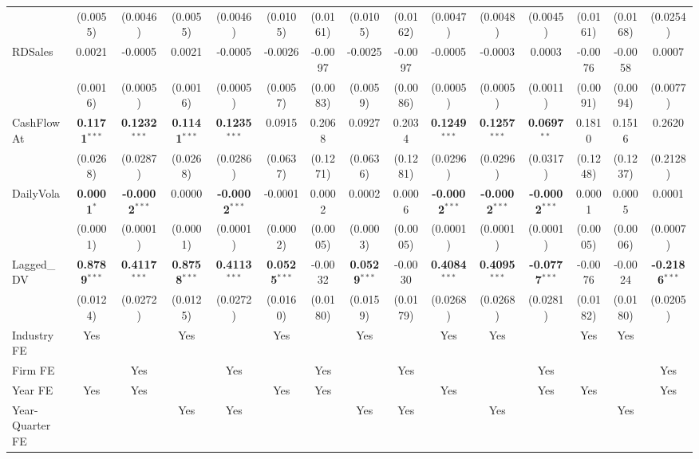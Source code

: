 \begin{landscape}
\begin{table}[H]
\begin{tabular}{lcccccccccccccc}
 & (0.0055) & (0.0046) & (0.0055) & (0.0046) & (0.0105) & (0.0161) & (0.0105) & (0.0162) & (0.0047) & (0.0048) & (0.0045) & (0.0161) & (0.0168) & (0.0254) \\
RDSales & 0.0021 & -0.0005 & 0.0021 & -0.0005 & -0.0026 & -0.0097 & -0.0025 & -0.0097 & -0.0005 & -0.0003 & 0.0003 & -0.0076 & -0.0058 & 0.0007 \\
 & (0.0016) & (0.0005) & (0.0016) & (0.0005) & (0.0057) & (0.0083) & (0.0059) & (0.0086) & (0.0005) & (0.0005) & (0.0011) & (0.0091) & (0.0094) & (0.0077) \\
CashFlowAt & \textbf{0.1171}$^{***}$ & \textbf{0.1232}$^{***}$ & \textbf{0.1141}$^{***}$ & \textbf{0.1235}$^{***}$ & 0.0915 & 0.2068 & 0.0927 & 0.2034 & \textbf{0.1249}$^{***}$ & \textbf{0.1257}$^{***}$ & \textbf{0.0697}$^{**}$ & 0.1810 & 0.1516 & 0.2620 \\
 & (0.0268) & (0.0287) & (0.0268) & (0.0286) & (0.0637) & (0.1271) & (0.0636) & (0.1281) & (0.0296) & (0.0296) & (0.0317) & (0.1248) & (0.1237) & (0.2128) \\
DailyVola & \textbf{0.0001}$^{*}$ & \textbf{-0.0002}$^{***}$ & 0.0000 & \textbf{-0.0002}$^{***}$ & -0.0001 & 0.0002 & 0.0002 & 0.0006 & \textbf{-0.0002}$^{***}$ & \textbf{-0.0002}$^{***}$ & \textbf{-0.0002}$^{***}$ & 0.0001 & 0.0005 & 0.0001 \\
 & (0.0001) & (0.0001) & (0.0001) & (0.0001) & (0.0002) & (0.0005) & (0.0003) & (0.0005) & (0.0001) & (0.0001) & (0.0001) & (0.0005) & (0.0006) & (0.0007) \\
Lagged\_DV & \textbf{0.8789}$^{***}$ & \textbf{0.4117}$^{***}$ & \textbf{0.8758}$^{***}$ & \textbf{0.4113}$^{***}$ & \textbf{0.0525}$^{***}$ & -0.0032 & \textbf{0.0529}$^{***}$ & -0.0030 & \textbf{0.4084}$^{***}$ & \textbf{0.4095}$^{***}$ & \textbf{-0.0777}$^{***}$ & -0.0076 & -0.0024 & \textbf{-0.2186}$^{***}$ \\
 & (0.0124) & (0.0272) & (0.0125) & (0.0272) & (0.0160) & (0.0180) & (0.0159) & (0.0179) & (0.0268) & (0.0268) & (0.0281) & (0.0182) & (0.0180) & (0.0205) \\
\midrule
Industry FE & Yes &  & Yes &  & Yes &  & Yes &  & Yes & Yes &  & Yes & Yes &  \\
Firm FE &  & Yes &  & Yes &  & Yes &  & Yes &  &  & Yes &  &  & Yes \\
Year FE & Yes & Yes &  &  & Yes & Yes &  &  & Yes &  & Yes & Yes &  & Yes \\
Year-Quarter FE &  &  & Yes & Yes &  &  & Yes & Yes &  & Yes &  &  & Yes &  \\
\midrule

\end{tabular}
\end{table}
\end{landscape}
